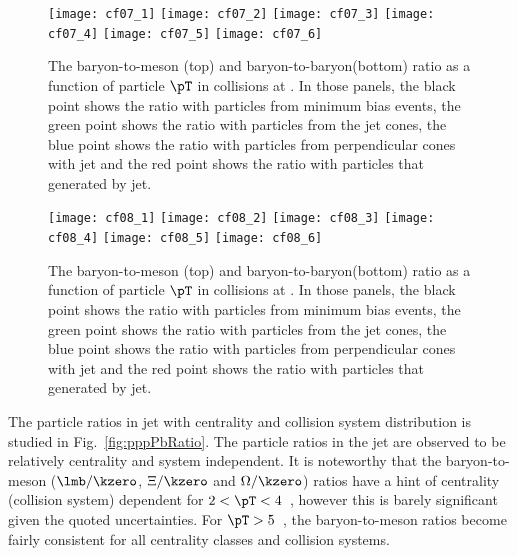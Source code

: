 \documentclass[ALICE,manyauthors]{cernphprep}
\begin{document}
\begin{figure}[!ht]
	\begin{center}
		\texttt{[image: cf07\_1]}
		\texttt{[image: cf07\_2]}
		\texttt{[image: cf07\_3]}
		\texttt{[image: cf07\_4]}
		\texttt{[image: cf07\_5]}
		\texttt{[image: cf07\_6]}
	\end{center}
	\caption{The baryon-to-meson (top) and baryon-to-baryon(bottom) ratio as a function of particle $\pT$ in \pp collisions at \thirteen. In those panels, the black point shows the ratio with particles from minimum bias events, the green point shows the ratio with particles from the jet cones, the blue point shows the ratio with particles from perpendicular cones with jet and the red point shows the ratio with particles that generated by jet.}
	\label{fig:ppRatio}
\end{figure}
\begin{figure}[!ht]
	\begin{center}
		\texttt{[image: cf08\_1]}
		\texttt{[image: cf08\_2]}
		\texttt{[image: cf08\_3]}
		\texttt{[image: cf08\_4]}
		\texttt{[image: cf08\_5]}
		\texttt{[image: cf08\_6]}
	\end{center}
	\caption{The baryon-to-meson (top) and baryon-to-baryon(bottom) ratio as a function of particle $\pT$ in \pPb collisions at \fivenn. In those panels, the black point shows the ratio with particles from minimum bias events, the green point shows the ratio with particles from the jet cones, the blue point shows the ratio with particles from perpendicular cones with jet and the red point shows the ratio with particles that generated by jet.}
	\label{fig:pPbRatio}
\end{figure}

The particle ratios in jet with centrality and collision system distribution is studied in Fig.~\ref{fig:pppPbRatio}. The particle ratios in the jet are observed to be relatively centrality and system independent. It is noteworthy that the baryon-to-meson ($\lmb/\kzero$, $\Xi/\kzero$ and $\Omega/\kzero$) ratios have a hint of centrality (collision system) dependent for $2 < \pT < 4$~\GeVc, however this is barely significant given the quoted uncertainties. For $\pT > 5$~\GeVc, the baryon-to-meson ratios become fairly consistent for all centrality classes and collision systems. 
\end{document}
